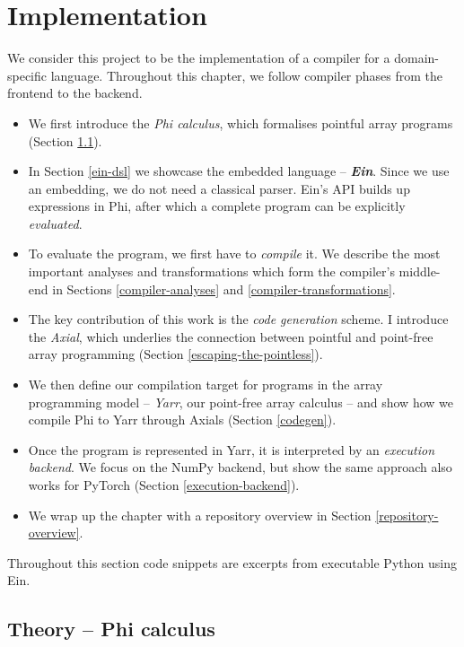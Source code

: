 \chapter{Implementation}

We consider this project to be the implementation of a compiler for a domain-specific language. Throughout this chapter, we follow compiler phases from the frontend to the backend. 
\begin{itemize}
    \item We first introduce the \textit{Phi calculus}, which formalises pointful array programs (Section \ref{phi-calculus}). 
    \item In Section \ref{ein-dsl} we showcase the embedded language -- \textit{\textbf{Ein}}. Since we use an embedding, we do not need a classical parser. Ein's API builds up expressions in Phi, after which a complete program can be explicitly \textit{evaluated}.
    \item To evaluate the program, we first have to \textit{compile} it. We describe the most important analyses and transformations which form the compiler's middle-end in Sections \ref{compiler-analyses} and \ref{compiler-transformations}.
    \item The key contribution of this work is the \textit{code generation} scheme. I introduce the \textit{Axial}, which underlies the connection between pointful and point-free array programming (Section \ref{escaping-the-pointless}). 
    \item We then define our compilation target for programs in the array programming model -- \textit{Yarr}, our point-free array calculus -- and show how we compile Phi to Yarr through Axials (Section \ref{codegen}). 
    \item Once the program is represented in Yarr, it is interpreted by an \textit{execution backend}. We focus on the  NumPy backend, but show the same approach also works for PyTorch (Section \ref{execution-backend}).
    \item We wrap up the chapter with a repository overview in Section \ref{repository-overview}.
\end{itemize}
Throughout this section code snippets are excerpts from executable Python using Ein. 


\newpage
\section{Theory -- Phi calculus}
\label{phi-calculus}

